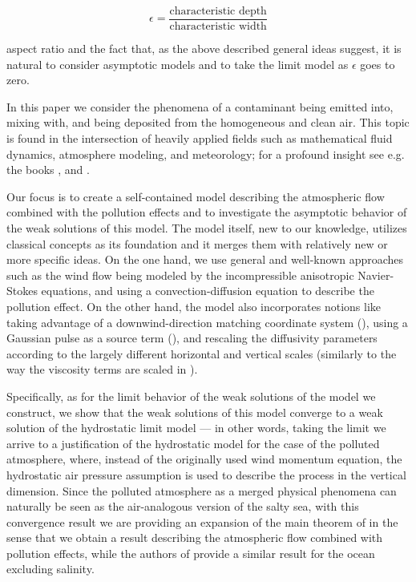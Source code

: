 \documentclass[11pt]{article}
\begin{document}
\[ \epsilon = \frac{\text{characteristic depth}}{\text{characteristic width}} \]

aspect ratio and the fact that, as the above described general ideas suggest, it is natural to consider asymptotic models and to take the limit model as $\epsilon$ goes to zero.

In this paper we consider the phenomena of a contaminant being emitted into, mixing with, and being deposited from the homogeneous and clean air. This topic is found in the intersection of heavily applied fields such as mathematical fluid dynamics, atmosphere modeling, and meteorology; for a profound insight see e.g. the books \cite{arya2001introduction}, \cite{pedlosky2013geophysical} and \cite{temam2001navier}.

Our focus is to create a self-contained model describing the atmospheric flow combined with the pollution effects and to investigate the asymptotic behavior of the weak solutions of this model. The model itself, new to our knowledge, utilizes classical concepts as its foundation and it merges them with relatively new or more specific ideas. On the one hand, we use general and well-known approaches such as the wind flow being modeled by the incompressible anisotropic Navier-Stokes equations, and using a convection-diffusion equation to describe the pollution effect. On the other hand, the model also incorporates notions like taking advantage of a downwind-direction matching coordinate system (\cite{goyal2011mathematical}), using a Gaussian pulse as a source term (\cite{zhuk2016source}), and rescaling the diffusivity parameters according to the largely different horizontal and vertical scales (similarly to the way the viscosity terms are scaled in \cite{azerad2001mathematical}).

Specifically, as for the limit behavior of the weak solutions of the model we construct, we show that the weak solutions of this model converge to a weak solution of the hydrostatic limit model --- in other words, taking the limit we arrive to a justification of the hydrostatic model for the case of the polluted atmosphere, where, instead of the originally used wind momentum equation, the hydrostatic air pressure assumption is used to describe the process in the vertical dimension. Since the polluted atmosphere as a merged physical phenomena can naturally be seen as the air-analogous version of the salty sea, with this convergence result we are providing an expansion of the main theorem of \cite{azerad2001mathematical} in the sense that we obtain a result describing the atmospheric flow combined with pollution effects, while the authors of \cite{azerad2001mathematical} provide a similar result for the ocean excluding salinity.
\end{document}
